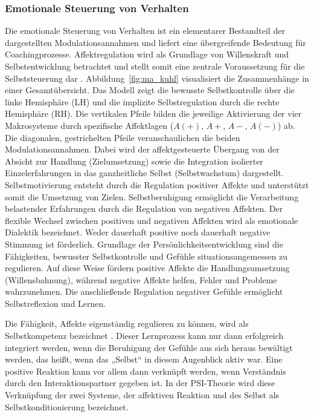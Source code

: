 \subsubsection{Emotionale Steuerung von Verhalten}
Die emotionale Steuerung von Verhalten ist ein elementarer Bestandteil der dargestellten Modulationsannahmen und liefert eine übergreifende Bedeutung für Coachingprozesse. Affektregulation wird als Grundlage von Willenskraft und Selbstentwicklung betrachtet und stellt somit eine zentrale Voraussetzung für die Selbststeuerung dar \citep{kuhl2005neue}. 
Abbildung~\ref{fig:ma_kuhl} visualisiert die Zusammenhänge in einer Gesamtübersicht. Das Modell zeigt die bewusste Selbstkontrolle über die linke Hemisphäre (LH) und die implizite Selbstregulation durch die rechte Hemisphäre (RH). Die vertikalen Pfeile bilden die jeweilige Aktivierung der vier Makrosysteme durch spezifische Affektlagen ($A(+)$, $A+$, $A-$, $A(-)$) ab. Die diagonalen, gestrichelten Pfeile veranschaulichen die beiden Modulationsannahmen. Dabei wird der affektgesteuerte Übergang von der Absicht zur Handlung (Zielumsetzung) sowie die Integration isolierter Einzelerfahrungen in das ganzheitliche Selbst (Selbstwachstum) dargestellt.
Selbstmotivierung entsteht durch die Regulation positiver Affekte und unterstützt somit die Umsetzung von Zielen. Selbstberuhigung ermöglicht die Verarbeitung belastender Erfahrungen durch die Regulation von negativen Affekten. Der flexible Wechsel zwischen positiven und negativen Affekten wird als emotionale Dialektik bezeichnet. Weder dauerhaft positive noch dauerhaft negative Stimmung ist förderlich. Grundlage der Persönlichkeitsentwicklung sind die Fähigkeiten, bewusster Selbstkontrolle und Gefühle situationsangemessen zu regulieren. Auf diese Weise fördern positive Affekte die Handlungsumsetzung (Willensbahnung), während negative Affekte helfen, Fehler und Probleme wahrzunehmen. Die anschließende Regulation negativer Gefühle ermöglicht Selbstreflexion und Lernen. 

Die Fähigkeit, Affekte eigenständig regulieren zu können, wird als Selbstkompetenz bezeichnet \citep{kuhl2014psi}. Dieser Lernprozess kann nur dann erfolgreich integriert werden, wenn die Beruhigung der Gefühle aus sich heraus bewältigt werden, das heißt, wenn das „Selbst“ in diesem Augenblick aktiv war. Eine positive Reaktion kann vor allem dann verknüpft werden, wenn Verständnis durch den Interaktionspartner gegeben ist. In der PSI-Theorie wird diese Verknüpfung der zwei Systeme, der affektiven Reaktion und des Selbst als Selbstkonditionierung bezeichnet.


